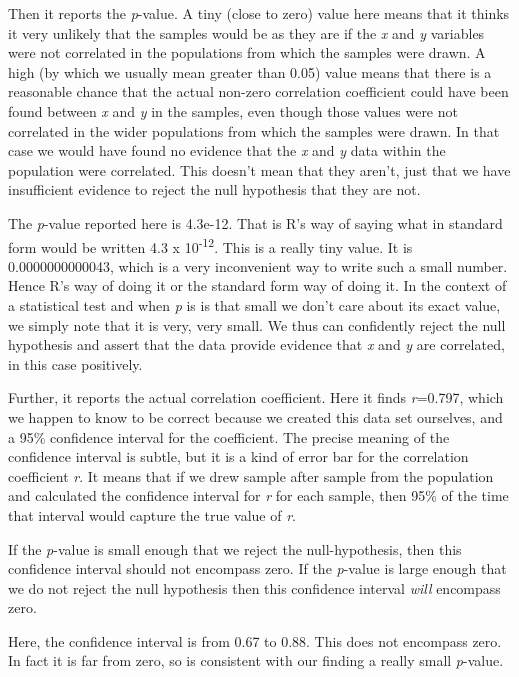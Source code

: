 \documentclass[
]{article}
\begin{document}
Then it reports the \emph{p}-value. A tiny (close to zero) value here
means that it thinks it very unlikely that the samples would be as they
are if the \emph{x} and \emph{y} variables were not correlated in the
populations from which the samples were drawn. A high (by which we
usually mean greater than 0.05) value means that there is a reasonable
chance that the actual non-zero correlation coefficient could have been
found between \emph{x} and \emph{y} in the samples, even though those
values were not correlated in the wider populations from which the
samples were drawn. In that case we would have found no evidence that
the \emph{x} and \emph{y} data within the population were correlated.
This doesn't mean that they aren't, just that we have insufficient
evidence to reject the null hypothesis that they are not.

The \emph{p}-value reported here is 4.3e-12. That is R's way of saying
what in standard form would be written 4.3 x 10\textsuperscript{-12}.
This is a really tiny value. It is 0.0000000000043, which is a very
inconvenient way to write such a small number. Hence R's way of doing it
or the standard form way of doing it. In the context of a statistical
test and when \emph{p} is is that small we don't care about its exact
value, we simply note that it is very, very small. We thus can
confidently reject the null hypothesis and assert that the data provide
evidence that \emph{x} and \emph{y} are correlated, in this case
positively.

Further, it reports the actual correlation coefficient. Here it finds
\emph{r}=0.797, which we happen to know to be correct because we created
this data set ourselves, and a 95\% confidence interval for the
coefficient. The precise meaning of the confidence interval is subtle,
but it is a kind of error bar for the correlation coefficient \emph{r}.
It means that if we drew sample after sample from the population and
calculated the confidence interval for \emph{r} for each sample, then
95\% of the time that interval would capture the true value of \emph{r}.

If the \emph{p}-value is small enough that we reject the
null-hypothesis, then this confidence interval should not encompass
zero. If the \emph{p}-value is large enough that we do not reject the
null hypothesis then this confidence interval \emph{will} encompass
zero.

Here, the confidence interval is from 0.67 to 0.88. This does not
encompass zero. In fact it is far from zero, so is consistent with our
finding a really small \emph{p}-value.
\end{document}
